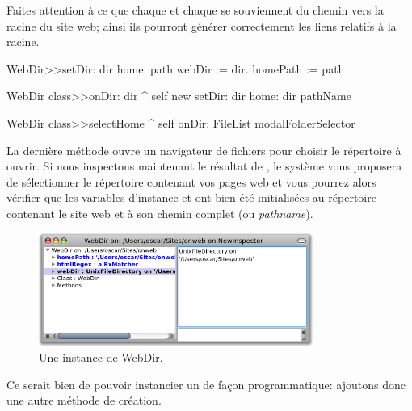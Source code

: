 \documentclass[a4paper,10pt,twoside]{book}
\begin{document}
Faites attention à ce que chaque  et chaque 
se souviennent du chemin vers la racine du site web; ainsi ils
pourront générer correctement les liens relatifs à la racine.


\begin{code}{}
WebDir>>setDir: dir home: path 
	webDir := dir.
	homePath := path

WebDir class>>onDir: dir
	^ self new setDir: dir home: dir pathName

WebDir class>>selectHome
	^ self onDir: FileList modalFolderSelector
\end{code}

La dernière méthode ouvre un navigateur de fichiers pour choisir le
répertoire à ouvrir.
Si nous inspectons maintenant le résultat de ,
le système vous proposera de sélectionner le répertoire contenant vos
pages web et vous pourrez alors vérifier que les variables d'instance
  et  ont bien été initialisées au répertoire
 contenant le site web et à son chemin complet (ou \emph{pathname}).

\begin{figure}[tbh]
\begin{center}
\includegraphics[width=0.8\textwidth]{aWebDir}
\caption{Une instance de WebDir.}
\end{center}
\end{figure}

Ce serait bien de pouvoir instancier un  de façon
programmatique: ajoutons donc une autre méthode de création.

\end{document}
